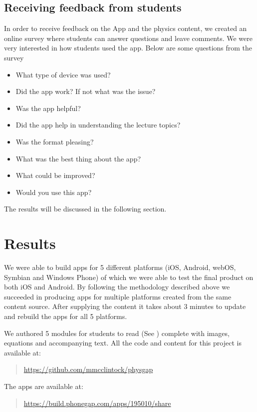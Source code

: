 \documentclass[12pt,a4paper]{article}  %
\begin{document}
\subsection{Receiving feedback from students}

In order to receive feedback on the App and the physics content, we created an online survey where students can answer questions and leave comments. We were very interested in how students used the app. Below are some questions from the survey

\begin{itemize}
\item What type of device was used?
\item Did the app work? If not what was the issue?
\item Was the app helpful?
\item Did the app help in understanding the lecture topics?
\item Was the format pleasing?
\item What was the best thing about the app?
\item What could be improved?
\item Would you use this app?
\end{itemize}

The results will be discussed in the following section.

\section{Results}

We were able to build apps for 5 different platforms (iOS, Android, webOS, Symbian and Windows Phone) of which we were able to test the final product on both iOS and Android. By following the methodology described above we succeeded in producing apps for multiple platforms created from the same content source. After supplying the content it takes about 3 minutes to update and rebuild the apps for all 5 platforms.

We authored 5 modules for students to read (See ) complete with images, equations and accompanying text. All the code and content for this project is available at:
\begin{quote}\url{https://github.com/mmcclintock/physgap}\end{quote}
The apps are available at:
\begin{quote}\url{https://build.phonegap.com/apps/195010/share}\end{quote}
\end{document}
